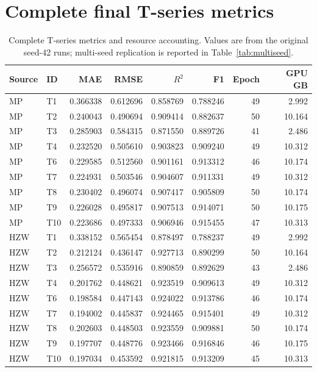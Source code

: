 \documentclass[a4paper,10pt]{article}
\begin{document}
\section{Complete final T-series metrics}

\begin{table}[htbp]
\centering
\caption{Complete T-series metrics and resource accounting. Values are from the original seed-42 runs; multi-seed replication is reported in Table~\ref{tab:multiseed}.}
\label{tab:full-t-series}
\scriptsize
\begin{tabular}{l l r r r r r r}
\toprule
Source & ID & MAE & RMSE & \(R^2\) & F1 & Epoch & GPU GB \\
\midrule
MP & T1 & 0.366338 & 0.612696 & 0.858769 & 0.788246 & 49 & 2.992 \\
MP & T2 & 0.240043 & 0.490694 & 0.909414 & 0.882637 & 50 & 10.164 \\
MP & T3 & 0.285903 & 0.584315 & 0.871550 & 0.889726 & 41 & 2.486 \\
MP & T4 & 0.232520 & 0.505610 & 0.903823 & 0.909240 & 49 & 10.312 \\
MP & T6 & 0.229585 & 0.512560 & 0.901161 & 0.913312 & 46 & 10.174 \\
MP & T7 & 0.224931 & 0.503546 & 0.904607 & 0.911331 & 49 & 10.312 \\
MP & T8 & 0.230402 & 0.496074 & 0.907417 & 0.905809 & 50 & 10.174 \\
MP & T9 & 0.226028 & 0.495817 & 0.907513 & 0.914071 & 50 & 10.175 \\
MP & T10 & 0.223686 & 0.497333 & 0.906946 & 0.915455 & 47 & 10.313 \\
\midrule
HZW & T1 & 0.338152 & 0.565454 & 0.878497 & 0.788237 & 49 & 2.992 \\
HZW & T2 & 0.212124 & 0.436147 & 0.927713 & 0.890299 & 50 & 10.164 \\
HZW & T3 & 0.256572 & 0.535916 & 0.890859 & 0.892629 & 43 & 2.486 \\
HZW & T4 & 0.201762 & 0.448621 & 0.923519 & 0.909613 & 49 & 10.312 \\
HZW & T6 & 0.198584 & 0.447143 & 0.924022 & 0.913786 & 46 & 10.174 \\
HZW & T7 & 0.194002 & 0.445837 & 0.924465 & 0.915401 & 49 & 10.312 \\
HZW & T8 & 0.202603 & 0.448503 & 0.923559 & 0.909881 & 50 & 10.174 \\
HZW & T9 & 0.197707 & 0.448776 & 0.923466 & 0.916846 & 46 & 10.175 \\
HZW & T10 & 0.197034 & 0.453592 & 0.921815 & 0.913209 & 45 & 10.313 \\
\bottomrule
\end{tabular}
\end{table}
\end{document}
